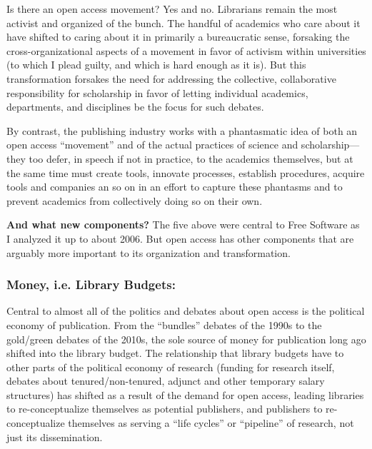 \documentclass[11pt]{article}
\begin{document}
Is there an open access movement?  Yes and no.  Librarians remain the most activist and organized of the bunch.  The handful of academics who care about it have shifted to caring about it in primarily a bureaucratic sense, forsaking the cross-organizational aspects of a movement in favor of activism within universities (to which I plead guilty, and which is hard enough as it is).  But this transformation forsakes the need for addressing the collective, collaborative responsibility for scholarship in favor of letting individual academics, departments, and disciplines be the focus for such debates. 

By contrast, the publishing industry works with a phantasmatic idea of both an open access ``movement'' and of the actual practices of science and scholarship--- they too defer, in speech if not in practice, to the academics themselves, but at the same time must create tools, innovate processes, establish procedures, acquire tools and companies an so on in an effort to capture these phantasms and to prevent academics from collectively doing so on their own. 


\textbf{And what new components?}  The five above were central to Free Software as I analyzed it up to about 2006.  But open access has other components that are arguably more important to its organization and transformation.

\subsubsection*{\textbf{Money, i.e. Library Budgets}:}
\label{sec:orgad33020}
Central to almost all of the politics and debates about open access is the political economy of publication.  From the ``bundles'' debates of the 1990s to the gold/green debates of the 2010s, the sole source of money for publication long ago shifted into the library budget. The relationship that library budgets have to other parts of the political economy of research (funding for research itself, debates about tenured/non-tenured, adjunct and other temporary salary structures) has shifted as a result of the demand for open access, leading libraries to re-conceptualize themselves as potential publishers, and publishers to re-conceptualize themselves as serving a ``life cycles'' or ``pipeline'' of research, not just its dissemination.
\end{document}
